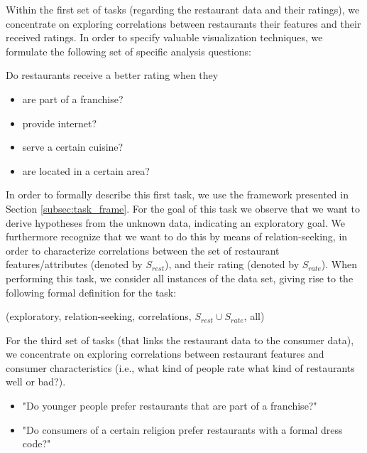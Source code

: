Within the first set of tasks (regarding the restaurant data and their ratings), we concentrate on exploring correlations between restaurants their features and their received ratings. In order to specify valuable visualization techniques, we formulate the following set of specific analysis questions:

Do restaurants receive a better rating when they
\begin{itemize}
\setlength{\itemsep}{0cm}%
\setlength{\parskip}{0cm}%
\item are part of a franchise?
\item provide internet?
\item serve a certain cuisine?
\item are located in a certain area?
\end{itemize}


In order to formally describe this first task, we use the framework presented in Section \ref{subsec:task_frame}. For the goal of this task we observe that we want to derive hypotheses from the unknown data, indicating an exploratory goal. We furthermore recognize that we want to do this by means of relation-seeking, in order to characterize correlations between the set of restaurant features/attributes (denoted by $S_{rest}$), and their rating (denoted by $S_{rate}$). When performing this task, we consider all instances of the data set, giving rise to the following formal definition for the task:

(exploratory, relation-seeking, correlations, $S_{rest} \cup S_{rate}$, all)

For the third set of tasks (that links the restaurant data to the consumer data), we concentrate on exploring correlations between restaurant features and consumer characteristics (i.e., what kind of people rate what kind of restaurants well or bad?).

\begin{itemize}
\setlength{\itemsep}{0cm}%
\setlength{\parskip}{0cm}%
\item "Do younger people prefer restaurants that are part of a franchise?"
\item "Do consumers of a certain religion prefer restaurants with a formal dress code?"
\end{itemize}

